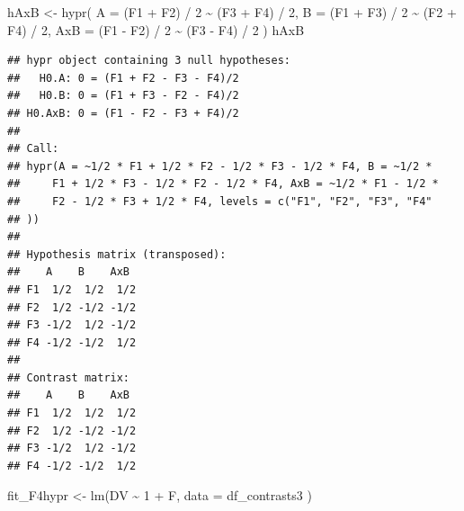 \documentclass[
  12pt,
]{krantz}
\newenvironment{Shaded}{\begin{snugshade}}{\end{snugshade}}
\newcommand{\AttributeTok}[1]{\textcolor[rgb]{0.77,0.63,0.00}{#1}}
\newcommand{\DecValTok}[1]{\textcolor[rgb]{0.00,0.00,0.81}{#1}}
\newcommand{\FunctionTok}[1]{\textcolor[rgb]{0.00,0.00,0.00}{#1}}
\newcommand{\NormalTok}[1]{#1}
\newcommand{\OtherTok}[1]{\textcolor[rgb]{0.56,0.35,0.01}{#1}}
\newcommand{\SpecialCharTok}[1]{\textcolor[rgb]{0.00,0.00,0.00}{#1}}
\theoremstyle{definition}
\theoremstyle{definition}
\theoremstyle{definition}
\theoremstyle{definition}
\theoremstyle{remark}
\begin{document}
\begin{Shaded}
\begin{Highlighting}[]
\NormalTok{hAxB }\OtherTok{\textless{}{-}} \FunctionTok{hypr}\NormalTok{(}
  \AttributeTok{A =}\NormalTok{ (F1 }\SpecialCharTok{+}\NormalTok{ F2) }\SpecialCharTok{/} \DecValTok{2} \SpecialCharTok{\textasciitilde{}}\NormalTok{ (F3 }\SpecialCharTok{+}\NormalTok{ F4) }\SpecialCharTok{/} \DecValTok{2}\NormalTok{,}
  \AttributeTok{B =}\NormalTok{ (F1 }\SpecialCharTok{+}\NormalTok{ F3) }\SpecialCharTok{/} \DecValTok{2} \SpecialCharTok{\textasciitilde{}}\NormalTok{ (F2 }\SpecialCharTok{+}\NormalTok{ F4) }\SpecialCharTok{/} \DecValTok{2}\NormalTok{,}
  \AttributeTok{AxB =}\NormalTok{ (F1 }\SpecialCharTok{{-}}\NormalTok{ F2) }\SpecialCharTok{/} \DecValTok{2} \SpecialCharTok{\textasciitilde{}}\NormalTok{ (F3 }\SpecialCharTok{{-}}\NormalTok{ F4) }\SpecialCharTok{/} \DecValTok{2}
\NormalTok{)}
\NormalTok{hAxB}
\end{Highlighting}
\end{Shaded}

\begin{verbatim}
## hypr object containing 3 null hypotheses:
##   H0.A: 0 = (F1 + F2 - F3 - F4)/2
##   H0.B: 0 = (F1 + F3 - F2 - F4)/2
## H0.AxB: 0 = (F1 - F2 - F3 + F4)/2
## 
## Call:
## hypr(A = ~1/2 * F1 + 1/2 * F2 - 1/2 * F3 - 1/2 * F4, B = ~1/2 * 
##     F1 + 1/2 * F3 - 1/2 * F2 - 1/2 * F4, AxB = ~1/2 * F1 - 1/2 * 
##     F2 - 1/2 * F3 + 1/2 * F4, levels = c("F1", "F2", "F3", "F4"
## ))
## 
## Hypothesis matrix (transposed):
##    A    B    AxB 
## F1  1/2  1/2  1/2
## F2  1/2 -1/2 -1/2
## F3 -1/2  1/2 -1/2
## F4 -1/2 -1/2  1/2
## 
## Contrast matrix:
##    A    B    AxB 
## F1  1/2  1/2  1/2
## F2  1/2 -1/2 -1/2
## F3 -1/2  1/2 -1/2
## F4 -1/2 -1/2  1/2
\end{verbatim}

\begin{Shaded}
\end{Shaded}

\begin{Shaded}
\begin{Highlighting}[]
\NormalTok{fit\_F4hypr }\OtherTok{\textless{}{-}} \FunctionTok{lm}\NormalTok{(DV }\SpecialCharTok{\textasciitilde{}} \DecValTok{1} \SpecialCharTok{+}\NormalTok{ F,}
  \AttributeTok{data =}\NormalTok{ df\_contrasts3}
\NormalTok{)}
\end{Highlighting}
\end{Shaded}
\end{document}
